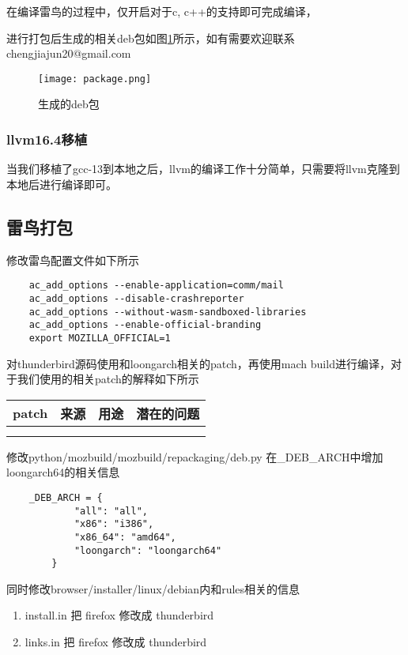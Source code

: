 \documentclass[lang=cn,a4paper,newtx]{elegantpaper}
\begin{document}
在编译雷鸟的过程中，仅开启对于c, c++的支持即可完成编译，

进行打包后生成的相关deb包如图\ref{deb}所示，如有需要欢迎联系chengjiajun20@gmail.com

\begin{figure}[!htb]
    \centering
    \texttt{[image: package.png]}
    \caption{生成的deb包}
    \label{deb}
\end{figure}

\subsubsection{llvm16.4移植}

当我们移植了gcc-13到本地之后，llvm的编译工作十分简单，只需要将llvm克隆到本地后进行编译即可。

\subsection{雷鸟打包}

修改雷鸟配置文件如下所示
\begin{lstlisting} 
    ac_add_options --enable-application=comm/mail
    ac_add_options --disable-crashreporter
    ac_add_options --without-wasm-sandboxed-libraries
    ac_add_options --enable-official-branding
    export MOZILLA_OFFICIAL=1
\end{lstlisting}

对thunderbird源码使用和loongarch相关的patch，再使用mach build进行编译，对于我们使用的相关patch的解释如下所示

\begin{center}
    \begin{tabular}{cccc}
        \toprule
        patch & 来源 & 用途 & 潜在的问题\\
        \midrule
        &  &  & \\
        &  &  & \\
        \bottomrule
    \end{tabular}
\end{center}

修改python/mozbuild/mozbuild/repackaging/deb.py 在\_DEB\_ARCH中增加loongarch64的相关信息

\begin{lstlisting}
    _DEB_ARCH = {
            "all": "all",
            "x86": "i386",
            "x86_64": "amd64",
            "loongarch": "loongarch64"
        }
\end{lstlisting}

同时修改browser/installer/linux/debian内和rules相关的信息
\begin{enumerate}
    \item install.in 把 firefox 修改成 thunderbird
    \item links.in 把 firefox 修改成 thunderbird
\end{enumerate}
\end{document}
